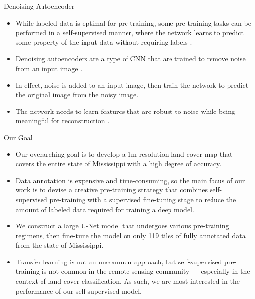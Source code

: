 \documentclass[aspectratio=169, hideallsubsectionså]{beamer}
\begin{document}
\begin{frame}{Denoising Autoencoder}
    \begin{itemize}
        \item<1-> While labeled data is optimal for pre-training, some pre-training tasks can be performed in a \alert{self-supervised} manner, where the network learns to predict some property of the input data without requiring labels \cite{liangRemoteSensingImage2018}.
        \item<2-> Denoising autoencoders are a type of CNN that are trained to remove noise from an input image \cite{gondaraMedicalImageDenoising2016}.
        \item<3-> In effect, noise is added to an input image, then train the network to predict the original image from the noisy image.
        \item<4-> The network needs to learn \alert{features} that are \alert{robust} to noise while being meaningful for reconstruction \cite{vincentExtractingComposingRobust2008}.
    \end{itemize}
\end{frame}



\begin{frame}{Our Goal}
    \begin{itemize}
        \item<1-> Our overarching goal is to develop a 1m resolution land cover map that covers the entire state of Mississippi with a high degree of accuracy.
        \item<2-> Data annotation is expensive and time-consuming, so the main focus of our work is to devise a creative pre-training strategy that combines self-supervised pre-training with a supervised fine-tuning stage to reduce the amount of labeled data required for training a deep model.
        \item<3-> We construct a large U-Net model that undergoes various pre-training regimens, then fine-tune the model on only \alert{119} tiles of fully annotated data from the state of Mississippi.
        \item<4-> Transfer learning is not an uncommon approach, but self-supervised pre-training is not common in the remote sensing community --- especially in the context of land cover classification. As such, we are most interested in the performance of our self-supervised model.
    \end{itemize}
\end{frame}
\end{document}
